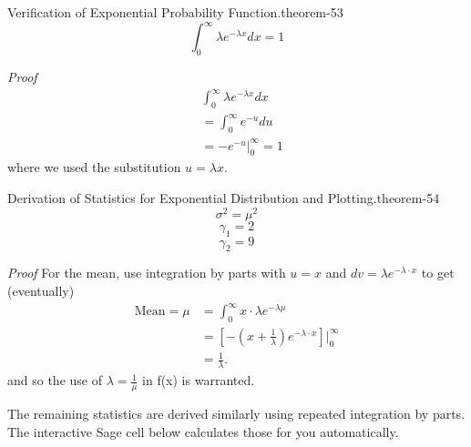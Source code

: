 \documentclass[10pt,]{book}
\makeatletter
\renewcommand*{\proofname}{Proof}
\renewenvironment{proof}[1][\proofname]{\par
  \pushQED{\qed}%
  \normalfont \topsep6\p@\@plus6\p@\relax
  \trivlist
  \item\relax
    {\itshape
    #1\@addpunct{.}}\hspace\labelsep\ignorespaces
}{%
  \popQED\endtrivlist\@endpefalse
}
\numberwithin{equation}{section}
\makeatother
\begin{document}
\par
\hypertarget{p-1081}{}%
\begin{theorem}{Verification of Exponential Probability Function.}{}{theorem-53}%
\hypertarget{p-1082}{}%
%
\begin{equation*}
\int_0^{\infty} \lambda e^{-\lambda x} dx = 1
\end{equation*}
%
\end{theorem}
\begin{proof}\hypertarget{proof-56}{}
\hypertarget{p-1083}{}%
%
\begin{align*}
& \int_0^{\infty} \lambda e^{-\lambda x} dx\\
& = \int_0^{\infty} e^{-u} du\\
& = -e^{-u} \big |_0^{\infty} = 1
\end{align*}
where we used the substitution \(u = \lambda x\).%
\end{proof}
%
\par
\hypertarget{p-1084}{}%
\begin{theorem}{Derivation of Statistics for Exponential Distribution and Plotting.}{}{theorem-54}%
\hypertarget{p-1085}{}%
%
\begin{equation*}
\sigma^2 = \mu^2
\end{equation*}
%
\begin{equation*}
\gamma_1 = 2
\end{equation*}
%
\begin{equation*}
\gamma_2 = 9
\end{equation*}
%
\end{theorem}
\begin{proof}\hypertarget{proof-57}{}
\hypertarget{p-1086}{}%
For the mean, use integration by parts with \(u = x\) and \(dv = \lambda e^{-\lambda \cdot x}\) to get (eventually)%
\begin{align*}
\text{Mean} = \mu & = \int_0^{\infty} x \cdot \lambda  e^{-\lambda \mu} \\
& = \left [ -(x+\frac{1}{\lambda}) e^{-\lambda \cdot x} \right ] \big |_0^{\infty} \\
& = \frac{1}{\lambda}.
\end{align*}
and so the use of \(\lambda = \frac{1}{\mu}\) in f(x) is warranted.%
\par
\hypertarget{p-1087}{}%
The remaining statistics are derived similarly using repeated integration by parts. The interactive Sage cell below calculates those for you automatically.%
\end{proof}
%
\par
\end{document}
